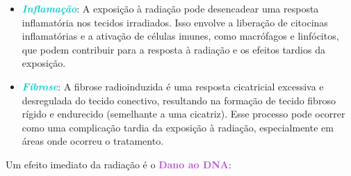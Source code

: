 \documentclass[11pt,a4paper]{article}
\begin{document}
\begin{itemize}
		\item \textcolor{DarkTurquoise}{\textbf{\textit{Inflamação}}}: A exposição à radiação pode desencadear uma resposta inflamatória nos tecidos irradiados. Isso envolve a liberação de citocinas inflamatórias e a ativação de células imunes, como macrófagos e linfócitos, que podem contribuir para a resposta à radiação e os efeitos tardios da exposição.			
		\item \textcolor{DarkTurquoise}{\textbf{\textit{Fibrose}}}: A fibrose radioinduzida é uma resposta cicatricial excessiva e desregulada do tecido conectivo, resultando na formação de tecido fibroso rígido e endurecido (semelhante a uma cicatriz). Esse processo pode ocorrer como uma complicação tardia da exposição à radiação, especialmente em áreas onde ocorreu o tratamento.
	\end{itemize}

	Um efeito imediato da radiação é o \textcolor{MediumOrchid}{\LobsterTwo\textbf{Dano ao DNA}}:
\end{document}
